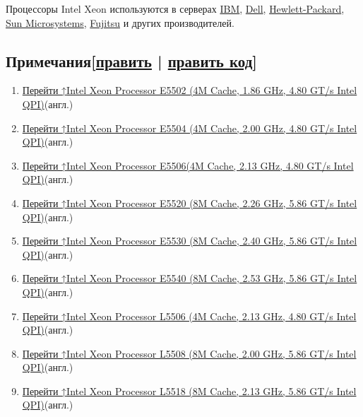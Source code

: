 \documentclass[a4paper,11pt]{article}
\begin{document}
Процессоры Intel Xeon используются в серверах \href{https://ru.wikipedia.org/wiki/IBM}{IBM}, \href{https://ru.wikipedia.org/wiki/Dell}{Dell}, \href{https://ru.wikipedia.org/wiki/Hewlett-Packard}{Hewlett-Packard}, \href{https://ru.wikipedia.org/wiki/Sun_Microsystems}{Sun Microsystems}, \href{https://ru.wikipedia.org/wiki/Fujitsu}{Fujitsu} и других производителей.

\subsection{Примечания[\href{https://ru.wikipedia.org/w/index.php?title=Xeon&amp;veaction=edit&amp;section=14}{править} | \href{https://ru.wikipedia.org/w/index.php?title=Xeon&amp;action=edit&amp;section=14}{править код}]}
\begin{enumerate}
	\item \hyperlink{cite_ref-1}{Перейти ↑}\href{http://ark.intel.com/Product.aspx?id=37092}{Intel Xeon Processor E5502 (4M Cache, 1.86 GHz, 4.80 GT/s Intel QPI)}\nolinebreak(англ.)
	\item \hyperlink{cite_ref-2}{Перейти ↑}\href{http://ark.intel.com/Product.aspx?id=37092}{Intel Xeon Processor E5504 (4M Cache, 2.00 GHz, 4.80 GT/s Intel QPI)}\nolinebreak(англ.)
	\item \hyperlink{cite_ref-3}{Перейти ↑}\href{http://ark.intel.com/Product.aspx?id=37092}{Intel Xeon Processor E5506(4M Cache, 2.13 GHz, 4.80 GT/s Intel QPI)}\nolinebreak(англ.)
	\item \hyperlink{cite_ref-4}{Перейти ↑}\href{http://ark.intel.com/Product.aspx?id=37092}{Intel Xeon Processor E5520 (8M Cache, 2.26 GHz, 5.86 GT/s Intel QPI)}\nolinebreak(англ.)
	\item \hyperlink{cite_ref-5}{Перейти ↑}\href{http://ark.intel.com/Product.aspx?id=37103}{Intel Xeon Processor E5530 (8M Cache, 2.40 GHz, 5.86 GT/s Intel QPI)}\nolinebreak(англ.)
	\item \hyperlink{cite_ref-6}{Перейти ↑}\href{http://ark.intel.com/Product.aspx?id=37104}{Intel Xeon Processor E5540 (8M Cache, 2.53 GHz, 5.86 GT/s Intel QPI)}\nolinebreak(англ.)
	\item \hyperlink{cite_ref-7}{Перейти ↑}\href{http://ark.intel.com/Product.aspx?id=40712}{Intel Xeon Processor L5506 (4M Cache, 2.13 GHz, 4.80 GT/s Intel QPI)}\nolinebreak(англ.)
	\item \hyperlink{cite_ref-8}{Перейти ↑}\href{http://ark.intel.com/Product.aspx?id=40726}{Intel Xeon Processor L5508 (8M Cache, 2.00 GHz, 5.86 GT/s Intel QPI)}\nolinebreak(англ.)
	\item \hyperlink{cite_ref-9}{Перейти ↑}\href{http://ark.intel.com/Product.aspx?id=40727}{Intel Xeon Processor L5518 (8M Cache, 2.13 GHz, 5.86 GT/s Intel QPI)}\nolinebreak(англ.)

\end{enumerate}
\end{document}
